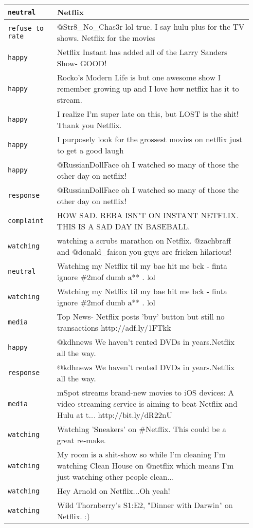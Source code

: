 {\begin{longtable}{|l|p{160mm}|}
      \tabularnewline\hline
         \texttt{neutral} & Netflix
      \tabularnewline\hline
         \texttt{refuse to rate} & @Str8\_No\_Chas3r lol true. I say hulu plus for the TV shows. Netflix for the movies
      \tabularnewline\hline
         \texttt{happy} & Netflix Instant has added all of the Larry Sanders Show- GOOD!
      \tabularnewline\hline
         \texttt{happy} & Rocko's Modern Life is but one awesome show I remember growing up and I love how netflix has it to stream.
      \tabularnewline\hline
         \texttt{happy} & I realize I'm super late on this, but LOST is the shit! Thank you Netflix.
      \tabularnewline\hline
         \texttt{happy} & I purposely look for the grossest movies on netflix just to get a good laugh
      \tabularnewline\hline
         \texttt{happy} & @RussianDollFace oh I watched so many of those the other day on netflix!
      \tabularnewline\hline
         \texttt{response} & @RussianDollFace oh I watched so many of those the other day on netflix!
      \tabularnewline\hline
         \texttt{complaint} & HOW SAD. REBA ISN'T ON INSTANT NETFLIX. THIS IS A SAD DAY IN BASEBALL.
      \tabularnewline\hline
         \texttt{watching} & watching a scrubs marathon on Netflix. @zachbraff and @donald\_faison you guys are fricken hilarious!
      \tabularnewline\hline
         \texttt{neutral} & Watching my Netflix til my bae hit me bck - finta ignore \#2mof dumb a** . lol
      \tabularnewline\hline
         \texttt{watching} & Watching my Netflix til my bae hit me bck - finta ignore \#2mof dumb a** . lol
      \tabularnewline\hline
         \texttt{media} & Top News- Netflix posts 'buy' button but still no transactions http://adf.ly/1FTkk
      \tabularnewline\hline
         \texttt{happy} & @kdhnews We haven't rented DVDs in years.Netflix all the way.
      \tabularnewline\hline
         \texttt{response} & @kdhnews We haven't rented DVDs in years.Netflix all the way.
      \tabularnewline\hline
         \texttt{media} & mSpot streams brand-new movies to iOS devices: A video-streaming service is aiming to beat Netflix and Hulu at t... http://bit.ly/dR22nU
      \tabularnewline\hline
         \texttt{watching} & Watching 'Sneakers' on \#Netflix. This could be a great re-make.
      \tabularnewline\hline
         \texttt{watching} & My room is a shit-show so while I'm cleaning I'm watching Clean House on @netflix which means I'm just watching other people clean...
      \tabularnewline\hline
         \texttt{watching} & Hey Arnold on Netflix...Oh yeah!
      \tabularnewline\hline
         \texttt{watching} & Wild Thornberry's S1:E2, "Dinner with Darwin" on Netflix. :)

\end{longtable}}
